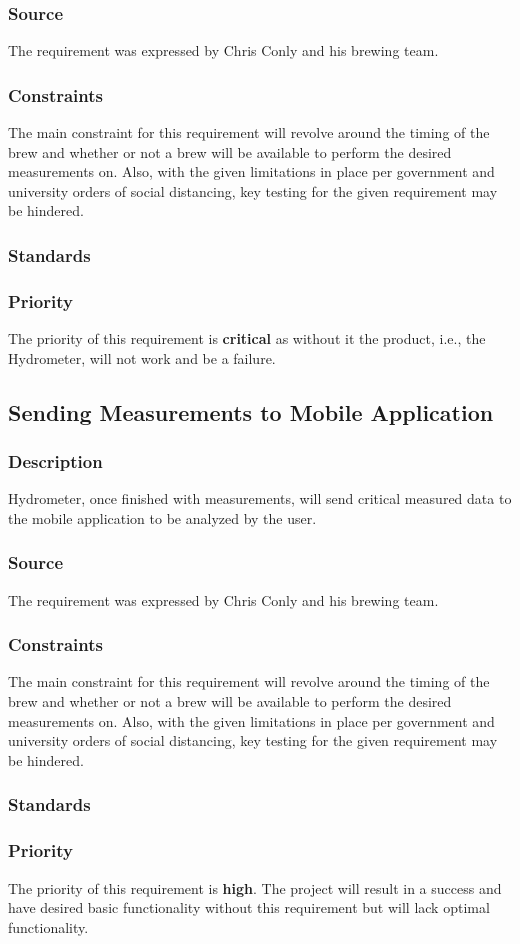 \subsubsection{Source}
The requirement was expressed by Chris Conly and his brewing team.
\subsubsection{Constraints}
The main constraint for this requirement will revolve around the timing of the brew and whether or not a brew will be available to perform the desired measurements on. Also, with the given limitations in place per government and university orders of social distancing, key testing for the given requirement may be hindered.
\subsubsection{Standards}

\subsubsection{Priority}
The priority of this requirement is \textbf{critical} as without it the product, i.e., the Hydrometer, will not work and be a failure.

\subsection{Sending Measurements to Mobile Application}
\subsubsection{Description}
Hydrometer, once finished with measurements, will send critical measured data to the mobile application to be analyzed by the user.
\subsubsection{Source}
The requirement was expressed by Chris Conly and his brewing team.
\subsubsection{Constraints}
The main constraint for this requirement will revolve around the timing of the brew and whether or not a brew will be available to perform the desired measurements on. Also, with the given limitations in place per government and university orders of social distancing, key testing for the given requirement may be hindered.
\subsubsection{Standards}
\subsubsection{Priority}
The priority of this requirement is \textbf{high}. The project will result in a success and have desired basic functionality without this requirement but will lack optimal functionality.